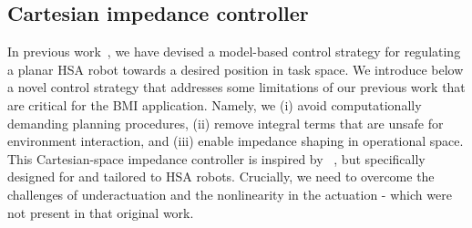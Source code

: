 \subsection{Cartesian impedance controller}\label{sub:braincontrol:computational_controller}
In previous work~\cite{stolzle2024experimental}, we have devised a model-based control strategy for regulating a planar \gls{HSA} robot towards a desired position in task space. %
%
We introduce below a novel control strategy that addresses some limitations of our previous work that are critical for the \gls{BMI} application. Namely, we (i) avoid computationally demanding planning procedures, (ii) remove integral terms that are unsafe for environment interaction, and (iii) enable impedance shaping in operational space. This Cartesian-space impedance controller is inspired by ~\cite{ott2008cartesian,della2020model}, but specifically designed for and tailored to \gls{HSA} robots. Crucially, we need to overcome the challenges of underactuation and the nonlinearity in the actuation - which were not present in that original work. %

